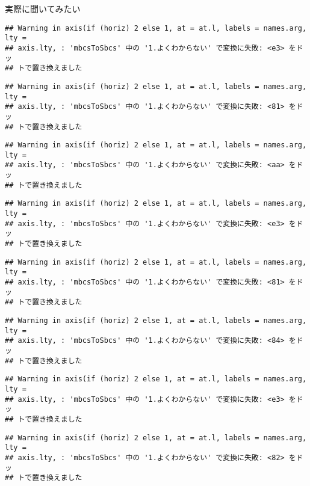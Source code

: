 \documentclass[ignorenonframetext,]{beamer}
\begin{document}
\begin{frame}[fragile]{実際に聞いてみたい}
\begin{verbatim}
## Warning in axis(if (horiz) 2 else 1, at = at.l, labels = names.arg, lty =
## axis.lty, : 'mbcsToSbcs' 中の '1.よくわからない' で変換に失敗: <e3> をドッ
## トで置き換えました
\end{verbatim}

\begin{verbatim}
## Warning in axis(if (horiz) 2 else 1, at = at.l, labels = names.arg, lty =
## axis.lty, : 'mbcsToSbcs' 中の '1.よくわからない' で変換に失敗: <81> をドッ
## トで置き換えました
\end{verbatim}

\begin{verbatim}
## Warning in axis(if (horiz) 2 else 1, at = at.l, labels = names.arg, lty =
## axis.lty, : 'mbcsToSbcs' 中の '1.よくわからない' で変換に失敗: <aa> をドッ
## トで置き換えました
\end{verbatim}

\begin{verbatim}
## Warning in axis(if (horiz) 2 else 1, at = at.l, labels = names.arg, lty =
## axis.lty, : 'mbcsToSbcs' 中の '1.よくわからない' で変換に失敗: <e3> をドッ
## トで置き換えました
\end{verbatim}

\begin{verbatim}
## Warning in axis(if (horiz) 2 else 1, at = at.l, labels = names.arg, lty =
## axis.lty, : 'mbcsToSbcs' 中の '1.よくわからない' で変換に失敗: <81> をドッ
## トで置き換えました
\end{verbatim}

\begin{verbatim}
## Warning in axis(if (horiz) 2 else 1, at = at.l, labels = names.arg, lty =
## axis.lty, : 'mbcsToSbcs' 中の '1.よくわからない' で変換に失敗: <84> をドッ
## トで置き換えました
\end{verbatim}

\begin{verbatim}
## Warning in axis(if (horiz) 2 else 1, at = at.l, labels = names.arg, lty =
## axis.lty, : 'mbcsToSbcs' 中の '1.よくわからない' で変換に失敗: <e3> をドッ
## トで置き換えました
\end{verbatim}

\begin{verbatim}
## Warning in axis(if (horiz) 2 else 1, at = at.l, labels = names.arg, lty =
## axis.lty, : 'mbcsToSbcs' 中の '1.よくわからない' で変換に失敗: <82> をドッ
## トで置き換えました
\end{verbatim}


\end{frame}
\end{document}
